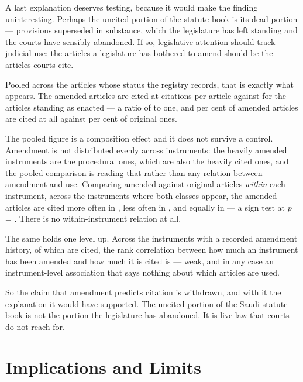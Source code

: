 \documentclass[12pt]{article}
\begin{document}
A last explanation deserves testing, because it would make the finding
uninteresting. Perhaps the uncited portion of the statute book is its dead
portion --- provisions superseded in substance, which the legislature has left
standing and the courts have sensibly abandoned. If so, legislative attention
should track judicial use: the articles a legislature has bothered to amend
should be the articles courts cite.

Pooled across the \nStatusArticles{} articles whose status the registry
records, that is exactly what appears. The \nAmendedArticles{} amended
articles are cited at \nAmendedPerArticle{} citations per article against
\nOriginalPerArticle{} for the \nOriginalArticles{} articles standing as
enacted --- a ratio of \nAmendedRatio{} to one, and
\nAmendedCitedShare{} per cent of amended articles are cited at all against
\nOriginalCitedShare{} per cent of original ones.

The pooled figure is a composition effect and it does not survive a control.
Amendment is not distributed evenly across instruments: the heavily amended
instruments are the procedural ones, which are also the heavily cited ones,
and the pooled comparison is reading that rather than any relation between
amendment and use. Comparing amended against original articles \emph{within}
each instrument, across the \nWithinInstruments{} instruments where both
classes appear, the amended articles are cited more often in
\nWithinAmendedHigher{}, less often in \nWithinOriginalHigher{}, and equally
in \nWithinTied{} --- a sign test at $p$ = \nWithinP{}. There is no
within-instrument relation at all.

The same holds one level up. Across the \nChurnInstruments{} instruments with
a recorded amendment history, of which \nChurnInstrumentsCited{} are cited,
the rank correlation between how much an instrument has been amended and how
much it is cited is \nChurnSpearman{} --- weak, and in any case an
instrument-level association that says nothing about which articles are used.

So the claim that amendment predicts citation is withdrawn, and with it the
explanation it would have supported. The uncited portion of the Saudi statute
book is not the portion the legislature has abandoned. It is live law that
courts do not reach for.

\section{Implications and Limits}
\label{sec:implications}
\end{document}
